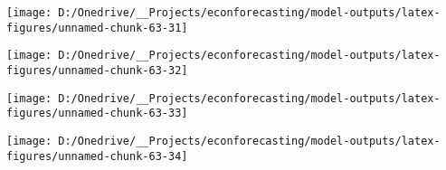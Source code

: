 \documentclass[11pt, letterpaper]{article}\usepackage[]{graphicx}\usepackage[]{color}
\begin{document}
{\centering \texttt{[image: D:/Onedrive/\_\_Projects/econforecasting/model-outputs/latex-figures/unnamed-chunk-63-31]} 

}




{\centering \texttt{[image: D:/Onedrive/\_\_Projects/econforecasting/model-outputs/latex-figures/unnamed-chunk-63-32]} 

}




{\centering \texttt{[image: D:/Onedrive/\_\_Projects/econforecasting/model-outputs/latex-figures/unnamed-chunk-63-33]} 

}




{\centering \texttt{[image: D:/Onedrive/\_\_Projects/econforecasting/model-outputs/latex-figures/unnamed-chunk-63-34]} 

}
\end{document}
